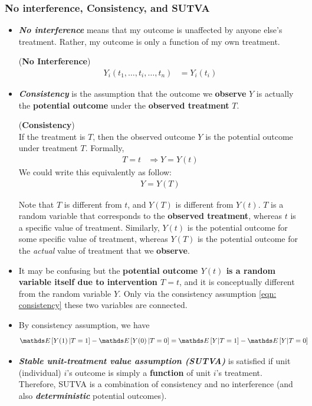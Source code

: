 \documentclass[11pt]{article}
\begin{document}
\subsubsection{No interference, Consistency, and SUTVA}
\begin{itemize}
\item \textbf{\emph{No interference}} means that my outcome is unaffected by anyone else’s treatment. Rather, my outcome is only a function of my own treatment.
\begin{assumption}(\textbf{No Interference}) \citep{neal2020introduction}\\
\begin{align}
Y_{i}(t_1, \ldots, t_i, \ldots, t_n) &= Y_{i}(t_i) \label{eqn: no_interference}
\end{align}
\end{assumption}

\item \textbf{\emph{Consistency}} is the assumption that the outcome we \textbf{observe} $Y$ is actually the \textbf{potential outcome} under the \textbf{observed treatment} $T$.
\begin{assumption}(\textbf{Consistency}) \citep{neal2020introduction}\\
If the treatment is $T$, then the observed outcome $Y$ is the potential outcome under treatment $T$. Formally,
\begin{align}
T=t &\Rightarrow Y = Y(t) \label{eqn: consistency}
\end{align}
We could write this equivalently as follow:
\begin{align}
Y = Y(T) \label{eqn: consistency2}
\end{align}
\end{assumption} Note that $T$ is different from $t$, and $Y(T)$ is different from $Y(t)$.  $T$ is a
random variable that corresponds to the \textbf{observed treatment}, whereas $t$ is a specific value of treatment. Similarly, $Y(t)$ is the potential outcome for
some specific value of treatment, whereas $Y(T)$ is the potential outcome for the \emph{actual} value of treatment that we \textbf{observe}.

\item It may be confusing but the \textbf{potential outcome $Y(t)$ is a random variable itself due to intervention $T=t$}, and it is conceptually different from the random variable $Y$. Only via the consistency assumption \eqref{eqn: consistency} these two variables are connected.


\item By consistency assumption, we have
\begin{align*}
  \E{}{Y(1)\,| T = 1} - \E{}{Y(0)\,| T = 0} &= \E{}{Y| T = 1} - \E{}{Y| T = 0}
\end{align*} 

\item \textbf{\emph{Stable unit-treatment value assumption (SUTVA)}} is satisfied if unit (individual) $i$'s outcome is simply a \textbf{function} of unit $i$'s treatment. Therefore, SUTVA is a combination of consistency and no interference (and also \emph{\textbf{deterministic}} potential outcomes). 
\end{itemize}
\end{document}

